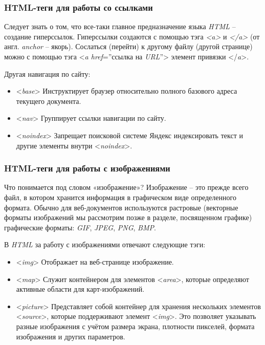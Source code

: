 \documentclass[a4paper,hidelinks,14pt]{extarticle}
\begin{document}
\subsubsection{HTML-теги для работы со ссылками}
Следует знать о том, что все-таки главное предназначение языка \textit{HTML} –  создание гиперссылок. Гиперссылки создаются с помощью тэга \textit{<a>} и \textit{</a>} (от англ. \textit{anchor} – якорь). Сослаться  (перейти) к другому файлу (другой странице)  можно с помощью тэга <\textit{a href}=”ссылка на \textit{URL}”> элемент привязки </\textit{a}>.

Другая навигация по сайту:
\begin{itemize}
    \item <\textit{base}> Инструктирует браузер относительно полного базового адреса текущего документа.
    \item <\textit{nav}> Группирует ссылки навигации по сайту.
    \item <\textit{noindex}> Запрещает поисковой системе Яндекс индексировать текст и другие элементы внутри <\textit{noindex}>.
\end{itemize}


\subsubsection{HTML-теги для работы с изображениями}

Что понимается под словом «изображение»?  Изображение – это прежде всего файл, в котором хранится информация в графическом виде определенного формата. Обычно для веб-документов используются растровые (векторные форматы изображений мы рассмотрим позже в разделе, посвященном графике) графические форматы: \textit{GIF}, \textit{JPEG}, \textit{PNG}, \textit{BMP}.

В \textit{HTML} за работу с изображениями отвечают следующие тэги:
\begin{itemize}
    \item <\textit{img}> Отображает на веб-странице изображение.
    \item <\textit{map}> Служит контейнером для элементов <\textit{area}>, которые определяют активные области для карт-изображений.
    \item <\textit{picture}> Представляет собой контейнер для хранения нескольких элементов <\textit{source}>, которые поддерживают элемент <\textit{img}>. Это позволяет указывать разные изображения с учётом размера экрана, плотности пикселей, формата изображения и других параметров.

\end{itemize}
\end{document}
